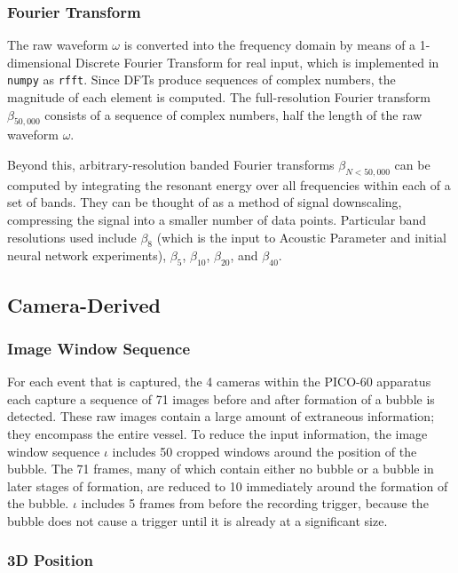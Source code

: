 \documentclass[10pt]{article}
\begin{document}
\subsubsection{Fourier Transform}

The raw waveform $\omega$ is converted into the frequency domain by means of a 1-dimensional Discrete Fourier Transform for real input, which is implemented in \texttt{numpy} as \texttt{rfft}. Since DFTs produce sequences of complex numbers, the magnitude of each element is computed. The full-resolution Fourier transform $\beta _{50,000}$ consists of a sequence of complex numbers, half the length of the raw waveform $\omega$.

Beyond this, arbitrary-resolution banded Fourier transforms $\beta _{N<50,000}$ can be computed by integrating the resonant energy over all frequencies within each of a set of bands. They can be thought of as a method of signal downscaling, compressing the signal into a smaller number of data points. Particular band resolutions used include $\beta _{8}$ (which is the input to Acoustic Parameter and initial neural network experiments), $\beta _{5}$, $\beta _{10}$, $\beta _{20}$, and $\beta _{40}$.

\subsection{Camera-Derived}

\subsubsection{Image Window Sequence}

For each event that is captured, the 4 cameras within the PICO-60 apparatus each capture a sequence of 71 images before and after formation of a bubble is detected. These raw images contain a large amount of extraneous information; they encompass the entire vessel. To reduce the input information, the image window sequence $\iota$ includes 50 cropped windows around the position of the bubble. The 71 frames, many of which contain either no bubble or a bubble in later stages of formation, are reduced to 10 immediately around the formation of the bubble. $\iota$ includes 5 frames from before the recording trigger, because the bubble does not cause a trigger until it is already at a significant size.

\subsubsection{3D Position}
\end{document}
